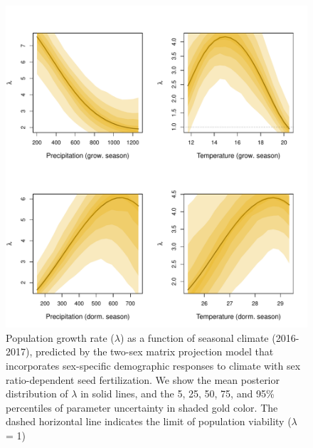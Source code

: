\documentclass[12pt]{article}
\begin{document}
\begin{figure}[H]
  \begin{center}
    \includegraphics[width=0.95\linewidth]{Figures/lambda_CI.pdf}
  \caption{Population growth rate ($\lambda$) as a function of seasonal climate (2016-2017), predicted by the two-sex matrix projection model that incorporates sex-specific demographic responses to climate with sex ratio-dependent seed fertilization.
We show the mean posterior distribution of $\lambda$ in solid lines, and the 5, 25, 50, 75, and 95\% percentiles of parameter uncertainty in shaded gold color.
The dashed horizontal line indicates the limit of population viability ($\lambda$ = 1)}
  \label{Sup:lambda2sex}
  \end{center}
\end{figure}
\end{document}
